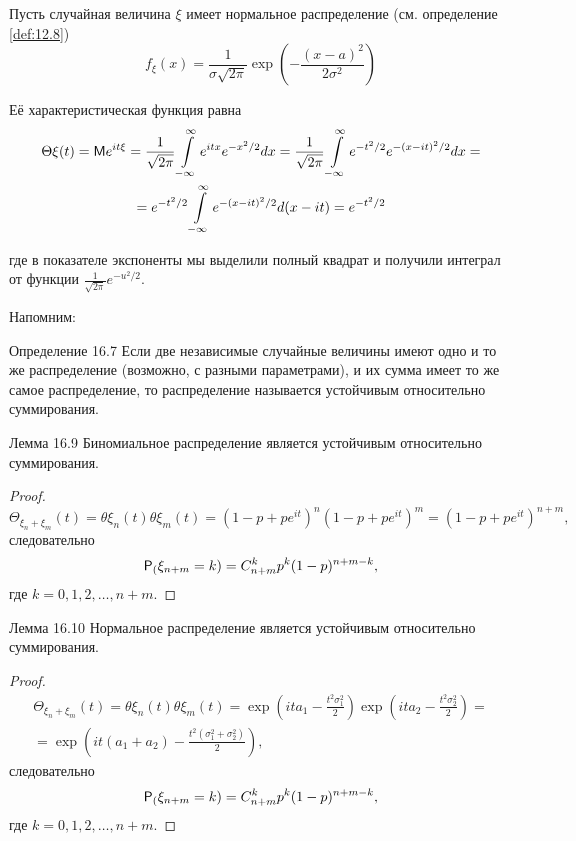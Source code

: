 \begin{example}
\label{ex:25.5}
Пусть случайная величина $\xi$ имеет нормальное распределение  (см. определение \ref{def:12.8})
$$
f_\xi(x)=\frac{1}{\sigma\sqrt{2\pi}}
\exp\left(
	-\frac{(x-a)^2}{2\sigma^2}
\right)
$$

Её характеристическая функция равна
%
%
\begin{gather*}
\Theta\xi (t)=\M e^{it\xi}=
\frac{1}{\sqrt{2\pi}}
\int\limits_{-\infty}^\infty e^{itx}e^{-x^2/2} dx=
%
\frac{1}{\sqrt{2\pi}}
\int\limits_{-\infty}^\infty e^{-t^2/2}e^{-(x-it)^2/2} dx=\\=
e^{-t^2/2}\int\limits_{-\infty}^\infty e^{-(x-it)^2/2} d(x-it)=
e^{-t^2/2}
\end{gather*}

где в показателе экспоненты мы выделили полный квадрат и получили интеграл от функции $\frac{1}{\sqrt{2\pi}}e^{-u^2/2}$.
\end{example}

Напомним:
\begin{repdefinition}{Определение 16.7}
Если две независимые случайные величины имеют одно и то же распределение (возможно, с разными параметрами), и их сумма имеет то же самое распределение, то распределение называется устойчивым относительно суммирования.
\end{repdefinition}

\begin{replemma}{Лемма 16.9}
Биномиальное распределение является устойчивым относительно суммирования.
\end{replemma}
\begin{proof}
\begin{equation*}
	\Theta_{\xi_n +\xi_m}(t) = \theta\xi_n(t)\theta\xi_m(t) = (1-p+pe^{it})^n (1-p+pe^{it})^m=(1-p+pe^{it})^{n+m},
\end{equation*}
следовательно
\begin{equation*}
	\P_(\xi_{n+m} = k) = C_{n+m}^k p^k (1-p)^{n+m-k},
\end{equation*}
где $k = 0, 1, 2, \ldots , n+m$.
\end{proof}


\begin{replemma}{Лемма 16.10}
Нормальное распределение является устойчивым относительно суммирования.
\end{replemma}
\begin{proof}
\begin{gather*}
	\Theta_{\xi_n +\xi_m}(t) = \theta\xi_n(t)\theta\xi_m(t) =
	\exp\left(
		ita_1-\frac{t^2\sigma_1^2}{2}
	\right)
	\exp\left(
		ita_2-\frac{t^2\sigma_2^2}{2}
	\right)
	=\\=
	\exp\left(
		it(a_1+a_2)-\frac{t^2(\sigma_1^2+\sigma_2^2)}{2}
	\right),
\end{gather*}
следовательно
\begin{equation*}
	\P_(\xi_{n+m} = k) = C_{n+m}^k p^k (1-p)^{n+m-k},
\end{equation*}
где $k = 0, 1, 2, \ldots , n+m$.
\end{proof}
